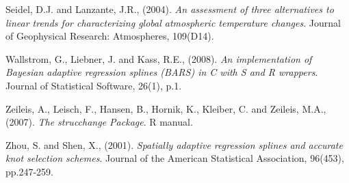 \documentclass[submit]{smj}
\begin{document}
\begin{thebibliography}{99}
Seidel, D.J. and Lanzante, J.R., (2004). 
\textit{An assessment of three alternatives to linear trends for characterizing global atmospheric temperature changes}. 
Journal of Geophysical Research: Atmospheres, 109(D14). 

Wallstrom, G., Liebner, J. and Kass, R.E., (2008). 
\textit{An implementation of Bayesian adaptive regression splines (BARS) in C with S and R wrappers}. 
Journal of Statistical Software, 26(1), p.1.

Zeileis, A., Leisch, F., Hansen, B., Hornik, K., Kleiber, C. and Zeileis, M.A., (2007). 
\textit{The strucchange Package}.
R manual.

Zhou, S. and Shen, X., (2001). 
\textit{Spatially adaptive regression splines and accurate knot selection schemes}.
Journal of the American Statistical Association, 96(453), pp.247-259.

\end{thebibliography}
\end{document}
